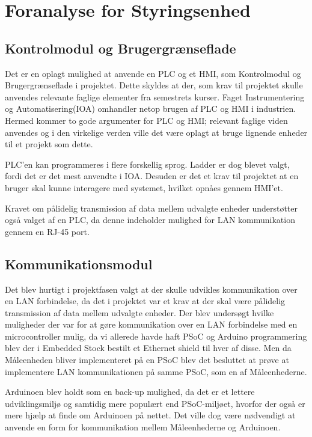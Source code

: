 
\section{Foranalyse for Styringsenhed}

\subsection{Kontrolmodul og Brugergrænseflade}
Det er en oplagt mulighed at anvende en PLC og et HMI, som Kontrolmodul og Brugergrænseflade i projektet. Dette skyldes at der, som krav til projektet skulle anvendes relevante faglige elementer fra semestrets kurser. Faget Instrumentering og Automatisering(IOA) omhandler netop brugen af PLC og HMI i industrien. Hermed kommer to gode argumenter for PLC og HMI; relevant faglige viden anvendes og i den virkelige verden ville det være oplagt at bruge lignende enheder til et projekt som dette.


PLC'en kan programmeres i flere forskellig sprog. Ladder er dog blevet valgt, fordi det er det mest anvendte i IOA. Desuden er det et krav til projektet at en bruger skal kunne interagere med systemet, hvilket opnåes gennem HMI'et.


Kravet om pålidelig transmission af data mellem udvalgte enheder understøtter også valget af en PLC, da denne indeholder mulighed for LAN kommunikation gennem en RJ-45 port.

\subsection{Kommunikationsmodul}
Det blev hurtigt i projektfasen valgt at der skulle udvikles kommunikation over en LAN forbindelse, da det i projektet var et krav at der skal være pålidelig transmission af data mellem udvalgte enheder. Der blev undersøgt hvilke muligheder der var for at gøre kommunikation over en LAN forbindelse med en microcontroller mulig, da vi allerede havde haft PSoC og Arduino programmering blev der i Embedded Stock bestilt et Ethernet shield til hver af disse. Men da Måleenheden bliver implementeret på en PSoC blev det besluttet at prøve at implementere LAN kommunikationen på samme PSoC, som en af Måleenhederne. 


Arduinoen blev holdt som en back-up mulighed, da det er et lettere udviklingsmiljø og samtidig mere populært end PSoC-miljøet, hvorfor der også er mere hjælp at finde om Arduinoen på nettet. Det ville dog være nødvendigt at anvende en form for kommunikation mellem Måleenhederne og Arduinoen. 






